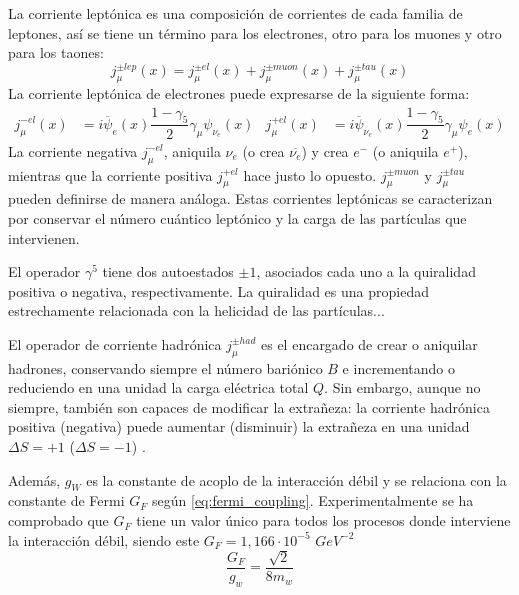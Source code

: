 La corriente leptónica es una composición de corrientes de cada familia de leptones, así se tiene un término para los electrones, otro para los muones y otro para los taones:
\begin{equation}
j_{\mu }^{\pm lep}\left( x\right) =j_{\mu }^{\pm el}\left( x\right) +j_{\mu }^{\pm muon}\left( x\right) +j_{\mu} ^{\pm tau}\left( x\right)\label{eq:leptonic_weak_current}
\end{equation}
La corriente leptónica de electrones puede expresarse de la siguiente forma:
\begin{align}
j_{\mu }^{-el}\left(x\right)&=i\overline{\psi}_{e}\left( x\right) \dfrac{1-\gamma_{5}}{2}\gamma _{\mu }\psi_{{ \nu}_{e}}\left( x\right) & j_{\mu}^{+el}\left(x\right)&= i\overline{\psi}_{{\nu}_{e}}\left(x\right) \dfrac{1-\gamma_{5}}{2}\gamma _{\mu}\psi_{e}\left( x\right)\label{eq:electric_weak_current}
\end{align}
La corriente negativa $j_{\mu }^{-el}$, aniquila $\nu_e$ (o crea $\overline{\nu_e}$) y crea $e^-$ (o aniquila $e^+$), mientras que la corriente positiva $j_{\mu }^{+el}$ hace justo lo opuesto. $j_{\mu }^{\pm muon}$ y $j_{\mu }^{\pm tau}$ pueden definirse de manera análoga. Estas corrientes leptónicas se caracterizan por conservar el número cuántico leptónico y la carga de las partículas que intervienen.

El operador $\gamma^5$ tiene dos autoestados $\pm 1$, asociados cada uno a la quiralidad positiva o negativa, respectivamente. La quiralidad es una propiedad estrechamente relacionada con la helicidad de las partículas...

El operador de corriente hadrónica $j_{\mu} ^{\pm had}$ es el encargado de crear o aniquilar hadrones, conservando siempre el número bariónico $B$ e incrementando o reduciendo en una unidad la carga eléctrica total $Q$. Sin embargo, aunque no siempre, también son capaces de modificar la extrañeza: la corriente hadrónica positiva (negativa) puede aumentar (disminuir) la extrañeza en una unidad $\Delta S = +1$ ($\Delta S = -1$) \cite{notas2020}.

Además, $g_W$ es la constante de acoplo de la interacción débil y se relaciona con la constante de Fermi $G_F$ según \ref{eq:fermi_coupling}. Experimentalmente se ha comprobado que $G_F$ tiene un valor único para todos los procesos donde interviene la interacción débil, siendo este $G_{F}=1,166 \cdot 10^{-5}$ $GeV^{−2}$ 
\begin{equation}
\dfrac{G_{F}}{g_{w}}=\dfrac{\sqrt{2}}{8m_{w}}\label{eq:fermi_coupling}
\end{equation}

